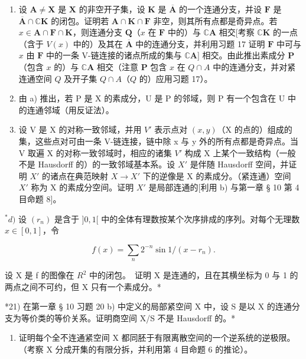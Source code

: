 \begin{enumerate}
\def\labelenumi{\alph{enumi})}
\item
  设 \(\mathbf{A} \neq \mathbf{X}\) 是 \(\mathbf{X}\) 的非空开子集，设 \(\mathbf{K}\) 是 \(\overline{\mathbf{A}}\) 的一个连通分支，并设 \(\mathbf{F}\) 是 \(\overline{\mathbf{A}} \cap \mathbb{C}\mathbf{K}\) 的闭包。证明若 \(\mathbf{A} \cap \mathbf{K} \cap \mathbf{F}\) 非空，则其所有点都是奇异点。若 \(x \in \mathbf{A} \cap \mathbf{F} \cap \mathbf{K}\)，则连通分支 \(\mathbf{Q}\)（\(x\) 在 \(\mathbf{F}\) 中的）与 \(\mathbb{C}\mathbf{A}\) 相交{[}考察 \(\mathbb{C}\mathbf{K}\) 的一点（含于 \(V(x)\) 中的）及其在 \(\overline{\mathbf{A}}\) 中的连通分支，并利用习题 17 证明 \(\mathbf{F}\) 中可与 \(x\) 由 \(\mathbf{F}\) 中的一条 V-链连接的诸点所成的集与 \(\mathbb{C}\mathbf{A}]\) 相交。由此推出素成分 \(\mathbf{P}\)（包含 \(x\) 的）与 \(\mathbb{C}\mathbf{A}\) 相交（注意 \(\mathbf{P}\) 包含 \(x\) 在 \(Q \cap A\) 中的连通分支，并对紧连通空间 \(Q\) 及开子集 \(Q \cap A\)（\(Q\) 的）应用习题 17）。
\item
  由 a) 推出，若 P 是 X 的素成分，U 是 P 的邻域，则 P 有一个包含在 U 中的连通邻域（用反证法）。
\item
  设 V 是 X 的对称一致邻域，并用 \(V'\) 表示点对 \((x, y)\)（X 的点的）组成的集，这些点对可由一条 V-链连接，链中除 x 与 y 外的所有点都是奇异点。当 V 取遍 X 的对称一致邻域时，相应的诸集 \(V'\) 构成 X 上某个一致结构（一般不是 Hausdorff 的）的一致邻域基本系。设 \(X'\) 是伴随 Hausdorff 空间，并证明 \(X'\) 的诸点在典范映射 \(X \rightarrow X'\) 下的逆像是 X 的素成分。（紧连通）空间 \(X'\) 称为 X 的素成分空间。证明 \(X'\) 是局部连通的{[}利用 b) 与第一章 § 10 第 4 目命题 8{]}。
\end{enumerate}

\(^{*}d)\) 设 \((r_{n})\) 是含于 \(]0,1[\) 中的全体有理数按某个次序排成的序列。对每个无理数 \(x\in[0,1]\)，令

\[
f (x) = \sum_ {n} 2 ^ {- n} \sin 1 / (x - r _ {n}).
\]

设 X 是 f 的图像在 \(R^{2}\) 中的闭包。~证明 X 是连通的，且在其横坐标为 0 与 1 的两点之间不可约，但 X 只有一个素成分。*

*21) 在第一章 § 10 习题 20 b) 中定义的局部紧空间 X 中，设 S 是以 X 的连通分支为等价类的等价关系。证明商空间 X/S 不是 Hausdorff 的。*

\begin{enumerate}
\def\labelenumi{\arabic{enumi})}
\setcounter{enumi}{21}
\tightlist
\item
  证明每个全不连通紧空间 X 都同胚于有限离散空间的一个逆系统的逆极限。（考察 X 分成开集的有限分拆，并利用第 4 目命题 6 的推论）。
\end{enumerate}

